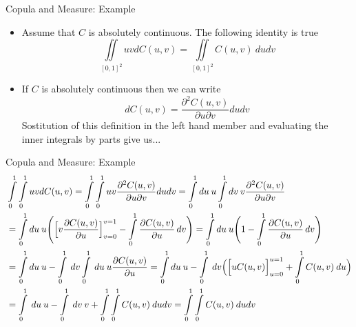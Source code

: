 \documentclass[11pt]{beamer}
\theoremstyle{plain}
\theoremstyle{definition}
\theoremstyle{remark}
\begin{document}
%
\begin{frame}{Copula and Measure: Example}
   \begin{itemize}
   	\item   				  						  
		Assume that $C$ is absolutely continuous. The following identity is true
		\begin{equation}
		\iint\limits_{[0, 1]^2} uv dC(u,v) = \iint\limits_{[0, 1]^2}  C(u,v) \> dudv 
		\end{equation}
	\item	
		If $C$ is absolutely continuous then we can write
			\begin{equation}
			dC(u, v) = \frac{\partial^2 C(u, v)}{\partial u \partial v} du dv
			\end{equation}
		Sostitution of this definition in the left hand member and evaluating the inner 		
		integrals by parts give us...
   \end{itemize}
\end{frame}%
%
\begin{frame}{Copula and Measure: Example}
   \footnotesize{
	\begin{equation}
	\begin{split}
	& \int\limits_0^1\int\limits_0^1 uv dC(u,v) = \int\limits_0^1\int\limits_0^1 uv 
	\frac{\partial^2 C(u, v)}{\partial u \partial v} du dv 
	= \int\limits_0^1 du \> u \int\limits_0^1 dv \> v \frac{\partial^2 C(u, v)}{\partial u 
	\partial v} \\
	& = \int\limits_0^1 du \> u \Biggl( \Bigl[ v \frac{\partial C(u, v)}{\partial u} 
	\Bigr]_{v=0}^{v=1} - \int\limits_0^1 \frac{\partial C(u, v)}{\partial u} \,dv \Biggr) 
	= \int\limits_0^1 du \> u \Biggl( 1 - \int\limits_0^1 \frac{\partial C(u, v)}{\partial 
	u} \, dv \Biggr) \\
	& = \int\limits_0^1 du \> u - \int\limits_0^1 \> dv \int\limits_0^1  \> du \> u 
	\frac{\partial C(u, v)}{\partial u} 
	= \int\limits_0^1 du \> u - \int\limits_0^1 \> dv \Bigl(\Bigl[ u C(u, v) \Bigr]_{u=0}
	^{u=1} + \int\limits_0^1 C(u,v) \> du \Bigl) \\ 
	& = \int\limits_0^1 \> du \> u - \int\limits_0^1 \> dv \> v + \int\limits_0^1 \int
	\limits_0^1 C(u,v) \> dudv = \int\limits_0^1 \int\limits_0^1 C(u,v) \> dudv  
	\end{split}
	\end{equation} 
  }
\end{frame}
\end{document}
